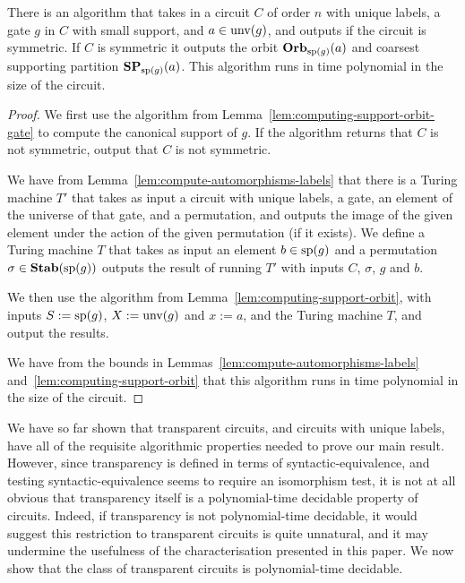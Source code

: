 \documentclass[../paper.tex]{subfiles}
\begin{document}
\begin{lem}
  There is an algorithm that takes in a circuit $C$ of order $n$ with unique
  labels, a gate $g$ in $C$ with small support, and $a \in \text{unv}(g)$, and
  outputs if the circuit is symmetric. If $C$ is symmetric it outputs the orbit
  $\text{\textbf{Orb}}_{\text{sp}(g)} (a)$ and coarsest supporting partition $\text{\textbf{SP}}_{\text{sp}(g)}(a)$.
  This algorithm runs in time polynomial in the size of the circuit.
  \label{lem:computing-support-orbit-index}
\end{lem}
\begin{proof}
  We first use the algorithm from Lemma~\ref{lem:computing-support-orbit-gate}
  to compute the canonical support of $g$. If the algorithm returns that $C$ is
  not symmetric, output that $C$ is not symmetric.

  We have from Lemma~\ref{lem:compute-automorphisms-labels} that there is a
  Turing machine $T'$ that takes as input a circuit with unique labels, a gate,
  an element of the universe of that gate, and a permutation, and outputs the
  image of the given element under the action of the given permutation (if it
  exists). We define a Turing machine $T$ that takes as input an element $b \in
  \text{sp}(g)$ and a permutation $\sigma \in \text{\textbf{Stab}} (\text{sp} (g))$ outputs the result of
  running $T'$ with inputs $C$, $\sigma$, $g$ and $b$.

  We then use the algorithm from Lemma~\ref{lem:computing-support-orbit}, with
  inputs $S := \text{sp}(g)$, $X := \text{unv}(g)$ and $x:= a$, and the Turing
  machine $T$, and output the results.

  We have from the bounds in Lemmas~\ref{lem:compute-automorphisms-labels}
  and~\ref{lem:computing-support-orbit} that this algorithm runs in time
  polynomial in the size of the circuit.
\end{proof}

We have so far shown that transparent circuits, and circuits with unique labels,
have all of the requisite algorithmic properties needed to prove our main
result. However, since transparency is defined in terms of
syntactic-equivalence, and testing syntactic-equivalence seems to require an
isomorphism test, it is not at all obvious that transparency itself is a
polynomial-time decidable property of circuits. Indeed, if transparency is not
polynomial-time decidable, it would suggest this restriction to transparent
circuits is quite unnatural, and it may undermine the usefulness of the
characterisation presented in this paper. We now show that the class of
transparent circuits is polynomial-time decidable.
\end{document}

